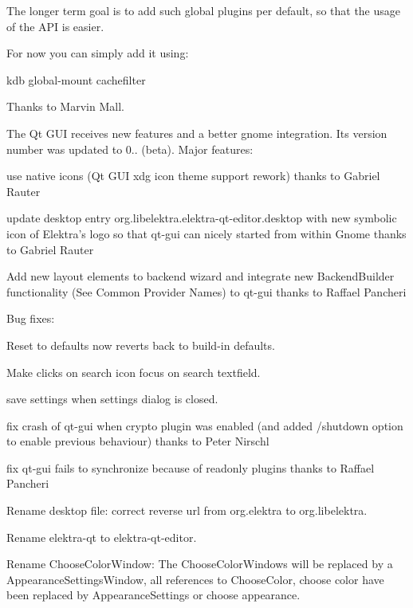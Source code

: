 The longer term goal is to add such global plugins per default, so that the usage of the A\+PI is easier.

For now you can simply add it using\+:


\begin{DoxyCode}
kdb global-mount cachefilter
\end{DoxyCode}


Thanks to Marvin Mall.

The Qt G\+UI receives new features and a better gnome integration. Its version number was updated to 0.. (beta). Major features\+:


\begin{DoxyItemize}
\item use native icons (Qt G\+UI xdg icon theme support rework) thanks to Gabriel Rauter
\item update desktop entry org.\+libelektra.\+elektra-\/qt-\/editor.\+desktop with new symbolic icon of Elektra’s logo so that qt-\/gui can nicely started from within Gnome thanks to Gabriel Rauter
\item Add new layout elements to backend wizard and integrate new Backend\+Builder functionality (See Common Provider Names) to qt-\/gui thanks to Raffael Pancheri
\end{DoxyItemize}

Bug fixes\+:


\begin{DoxyItemize}
\item Reset to defaults now reverts back to build-\/in defaults.
\item Make clicks on search icon focus on search textfield.
\item save settings when settings dialog is closed.
\item fix crash of qt-\/gui when crypto plugin was enabled (and added /shutdown option to enable previous behaviour) thanks to Peter Nirschl
\item fix qt-\/gui fails to synchronize because of readonly plugins thanks to Raffael Pancheri
\item Rename desktop file\+: correct reverse url from org.\+elektra to org.\+libelektra.
\item Rename elektra-\/qt to elektra-\/qt-\/editor.
\item Rename Choose\+Color\+Window\+: The Choose\+Color\+Windows will be replaced by a Appearance\+Settings\+Window, all references to Choose\+Color, choose color have been replaced by Appearance\+Settings or choose appearance.
\end{DoxyItemize}

